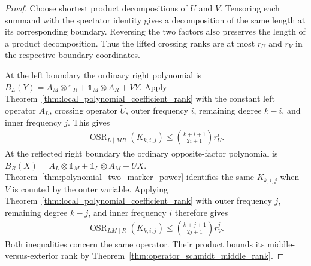\begin{proof}
    \leanok
    Choose shortest product decompositions of $U$ and $V$. Tensoring each
    summand with the spectator identity gives a decomposition of the same
    length at its corresponding boundary. Reversing the two factors also
    preserves the length of a product decomposition. Thus the lifted crossing
    ranks are at most $r_U$ and $r_V$ in the respective boundary coordinates.

    At the left boundary the ordinary right polynomial is
    $B_L(Y)=A_M\otimes\mathbb 1_R+\mathbb 1_M\otimes A_R+VY$.
    Apply Theorem~\ref{thm:local_polynomial_coefficient_rank} with the
    constant left operator $A_L$, crossing operator $\widetilde U$,
    outer frequency $i$, remaining degree $k-i$, and inner frequency $j$.
    This gives
    \begin{align*}
        \operatorname{OSR}_{L\mid MR}(K_{k,i,j})
            \le\binom{k+i+1}{2i+1}r_U^i.
    \end{align*}
    At the reflected right boundary the ordinary opposite-factor polynomial
    is $B_R(X)=A_L\otimes\mathbb 1_M+\mathbb 1_L\otimes A_M+UX$.
    Theorem~\ref{thm:polynomial_two_marker_power} identifies the same
    $K_{k,i,j}$ when $V$ is counted by the outer variable.
    Applying Theorem~\ref{thm:local_polynomial_coefficient_rank} with
    outer frequency $j$, remaining degree $k-j$, and inner frequency $i$
    therefore gives
    \begin{align*}
        \operatorname{OSR}_{LM\mid R}(K_{k,i,j})
            \le\binom{k+j+1}{2j+1}r_V^j.
    \end{align*}
    Both inequalities concern the same operator. Their product bounds its
    middle-versus-exterior rank by
    Theorem~\ref{thm:operator_schmidt_middle_rank}.
\end{proof}

